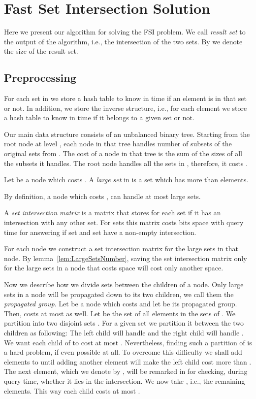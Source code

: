 \documentclass[10pt]{llncs}
\begin{document}
\section{Fast Set Intersection Solution}\label{sec:FSI Solution}
Here we present our algorithm for solving the FSI problem.
We call \emph{result set} to the output of the algorithm, i.e., the intersection of the two sets.
By  we denote the size of the result set.

\subsection{Preprocessing}
For each set in  we store a hash table to know in  time if an element is in that set or not.
In addition, we store the inverse structure,
i.e., for each element we store a hash table to know in  time if it belongs to a given set or not.

Our main data structure consists of an unbalanced binary tree.
Starting from the root node at level ,
each node in that tree handles number of subsets of the original sets from .
The cost of a node in that tree is the sum of the sizes of all the subsets it handles.
The root node handles all the  sets in , therefore, it costs .

\begin{definition}
Let  be a node which costs .
A \emph{large set} in  is a set which has more than  elements.
\end{definition}

\begin{lemma}\label{lem:LargeSetsNumber}
By definition, a node  which costs ,
can handle at most  large sets.
\end{lemma}

A \emph{set intersection matrix} is a matrix that stores for each set
if it has an intersection with any other set.
For  sets this matrix costs  bits space
with  query time for answering if set  and set  have a non-empty intersection.

For each node we construct a set intersection matrix for the large sets in that node.
By lemma~\ref{lem:LargeSetsNumber}, saving the set intersection matrix
only for the large sets in a node that costs  space will cost only another  space.

Now we describe how we divide sets between the children of a node.
Only large sets in a node will be propagated down to its two children,
we call them the \emph{propagated group}.
Let  be a node which costs  and let  be its propagated group.
Then,  costs at most  as well.
Let  be the set of all elements in the sets of .
We partition  into two disjoint sets .
For a given set  we partition it between the two children as following:
The left child will handle 
and the right child will handle .
We want each child of  to cost at most .
Nevertheless, finding such a partition of  is a hard problem,
if even possible at all.
To overcome this difficulty we shall add elements to 
until adding another element will make the left child cost more than .
The next element, which we denote by , will be remarked in  for checking, during query time,
whether it lies in the intersection.
We now take  , i.e., the remaining elements.
This way each child costs at most .
\end{document}

